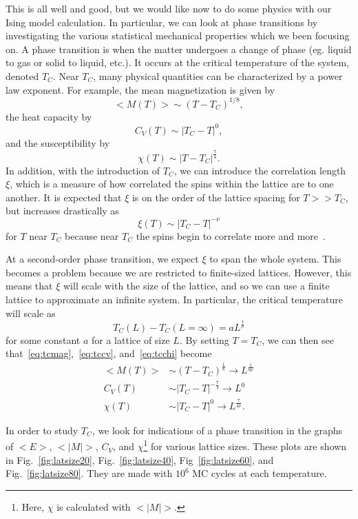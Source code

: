 \documentclass[12pt]{article}
\numberwithin{equation}{section}
\begin{document}
\par This is all well and good, but we would like now to do some physics with our Ising model calculation.  In particular, we can look at phase transitions by investigating the various statistical mechanical properties which we been focusing on.  A phase transition is when the matter undergoes a change of phase (eg. liquid to gas or solid to liquid, etc.).  It occurs at the critical temperature of the system, denoted $T_{C}$.  Near $T_{C}$, many physical quantities can be characterized by a power law exponent.  For example, the mean magnetization is given by
\begin{equation}
\label{eq:tcmag}
<M(T)>\sim(T-T_{C})^{1/8},
\end{equation}
the heat capacity by
\begin{equation}
\label{eq:tccv}
C_{V}(T)\sim|T_{C}-T|^{0},
\end{equation}
and the susceptibility by
\begin{equation}
\label{eq:tcchi}
\chi(T)\sim|T-T_{C}|^{\frac{7}{4}}.
\end{equation}
In addition, with the introduction of $T_{C}$, we can introduce the correlation length $\xi$, which is a measure of how correlated the spins within the lattice are to one another.  It is expected that $\xi$ is on the order of the lattice spacing for $T>>T_{C}$, but increases drastically as
\begin{equation}
\label{eq:tccorr}
\xi(T)\sim|T_{C}-T|^{-\nu}
\end{equation}
for $T$ near $T_{C}$ because near $T_{C}$ the spins begin to correlate more and more~\cite{lecture}.
\par At a second-order phase transition, we expect $\xi$ to span the whole system.  This becomes a problem because we are restricted to finite-sized lattices.  However, this means that $\xi$ will scale with the size of the lattice, and so we can use a finite lattice to approximate an infinite system.  In particular, the critical temperature will scale as
\begin{equation}
\label{eq:tcscale}
T_{C}(L)-T_{C}(L=\infty)=aL^{\frac{1}{\nu}}
\end{equation}
for some constant $a$ for a lattice of size $L$.  By setting $T=T_{C}$, we can then see that~\eqref{eq:tcmag},~\eqref{eq:tccv}, and~\eqref{eq:tcchi} become~\cite{lecture}
\begin{align}
\label{eq:tcquants}
<M(T)> & \sim  (T-T_{C})^{\frac{1}{8}} \rightarrow  L^{\frac{1}{8\nu}} \\
C_{V}(T) & \sim  |T_{C}-T|^{-\frac{7}{4}} \rightarrow  L^{0} \\
\chi(T) & \sim  |T_{C}-T|^{0} \rightarrow L^{\frac{7}{4\nu}}. 
\end{align}
\par In order to study $T_{C}$, we look for indications of a phase transition in the graphs of $<E>$, $<|M|>$, $C_{V}$, and $\chi$\footnote{Here, $\chi$ is calculated with $<|M|>$.} for various lattice sizes.  These plots are shown in Fig.~\ref{fig:latsize20}, Fig.~\ref{fig:latsize40}, Fig~\ref{fig:latsize60}, and Fig.~\ref{fig:latsize80}.  They are made with $10^{6}$ MC cycles at each temperature.
\end{document}
